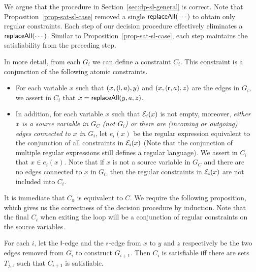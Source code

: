 We argue that the procedure in Section~\ref{sec:dp-sl-general} is correct.
Note that Proposition~\ref{prop-sat-sl-case} removed a single $\mathsf{replaceAll}(\cdots)$ to obtain only regular constraints.
Each step of our decision procedure effectively eliminates a $\mathsf{replaceAll}(\cdots)$.
Similar to Proposition~\ref{prop-sat-sl-case}, each step maintains the satisfiability from the preceding step.

In more detail, from each $G_i$ we can define a constraint $C_i$. This constraint is a conjunction of the following atomic constraints.
\begin{itemize}
\item For each variable $x$ such that $(x, (\mathsf{l}, a), y)$ and $(x, (\mathsf{r},a), z)$ are the edges in $G_i$, we assert in $C_i$ that $x = \mathsf{replaceAll}(y, a, z)$.
\item In addition, for each variable $x$ such that $\mathcal{E}_i(x)$ is not empty, moreover, \emph{either $x$ is a source variable in $G_C$ (not $G_i$) or there are (incoming or outgoing) edges connected to $x$ in $G_i$}, let $e_i(x)$ be the regular expression equivalent to the conjunction of all constraints in $\mathcal{E}_i(x)$ (Note that the conjunction of multiple regular expressions still defines a regular language). We assert in $C_i$ that $x \in e_i(x)$. Note that if $x$ is not a source variable in $G_C$ and there are no edges connected to $x$ in $G_i$, then the regular constraints in $\mathcal{E}_i(x)$ are not included into $C_i$.
\end{itemize}


It is immediate that $C_0$ is equivalent to $C$.
We require the following proposition, which gives us the correctness of the decision procedure by induction.
Note that the final $C_i$ when exiting the loop will be a conjunction of regular constraints on the source variables.

\begin{proposition}
    For each $i$,  let the $\mathsf{l}$-edge and the $\mathsf{r}$-edge from $x$ to $y$ and $z$ respectively be the two edges removed from $G_i$ to construct $G_{i+1}$. Then $C_i$ is satisfiable iff there are sets $T_{j, z}$ such that $C_{i+1}$ is satisfiable.
\end{proposition}

